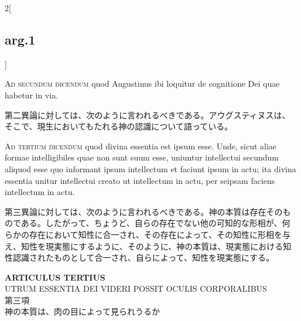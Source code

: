 \documentclass[paper=a4paper,fontsize=10pt,jafontsize=9pt,titlepage]{jlreq}
\begin{document}
\begin{paracol}{2}[\subsection{arg.1}]
\switchcolumn*[\subsection{ad.2}]

{\scshape  Ad secundum dicendum} quod Augustinus ibi loquitur de
cognitione Dei quae habetur in via.

\switchcolumn

第二異論に対しては、次のように言われるべきである。アウグスティヌスは、
そこで、現生においてもたれる神の認識について語っている。

\switchcolumn*[\subsection{ad.3}]

{\scshape Ad tertium dicendum} quod divina essentia est ipsum esse. Unde,
sicut aliae formae intelligibiles quae non sunt suum esse, uniuntur
intellectui secundum aliquod esse quo informant ipsum intellectum et
faciunt ipsum in actu; ita divina essentia unitur intellectui creato
ut intellectum in actu, per seipsam faciens intellectum in actu.

\switchcolumn

第三異論に対しては、次のように言われるべきである。神の本質は存在そのも
のである。したがって、ちょうど、自らの存在でない他の可知的な形相が、何
らかの存在において知性に合一され、その存在によって、その知性に形相を与
え、知性を現実態にするように、そのように、神の本質は、現実態における知
性認識されたものとして合一され、自らによって、知性を現実態にする。

\end{paracol}
\newpage

\begin{center}
{\Large {\bfseries ARTICULUS TERTIUS}}\\
{\large UTRUM ESSENTIA DEI VIDERI POSSIT OCULIS CORPORALIBUS}\\
{\large 第三項\\神の本質は、肉の目によって見られうるか}
\end{center}

{}
\setcounter{section}{3}
\setcounter{subsection}{0}
\end{document}
